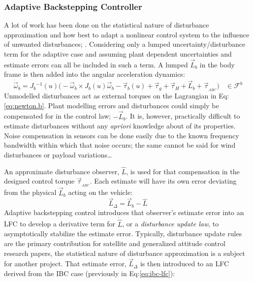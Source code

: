 {\subsubsection{Adaptive Backstepping Controller}
\label{subsubsec:control.attitude.nonlinear.adaptivebackstep}
A lot of work has been done on the statistical nature of disturbance approximation and how best to adapt a nonlinear control system to the influence of unwanted disturbances; \cite{nonlineardisturbance,disturbanceadaptivebackstepping,robusttrackingcontrol}. Considering only a lumped uncertainty/disturbance term for the adaptive case and assuming plant dependent uncertainties and estimate errors can all be included in such a term. A lumped $\vec{L}_b$ in the body frame is then added into the angular acceleration dynamics:
\begin{equation}
\dot{\vec{\omega}}_b=J_b\text{}^{-1}(u)\big(-\vec{\omega}_b\times J_b(u)\vec{\omega}_b-\vec{\tau}_b(u)+\vec{\tau}_g+\vec{\tau}_H+\vec{L}_b+\vec{\tau}_{_{ABC}}\big)~~~~\in\mathcal{F}^{b}
\end{equation}
Unmodelled disturbances act as external torques on the Lagrangian in Eq:\ref{eq:newton.b}. Plant modelling errors and disturbances could simply be compensated for in the control law; $-\vec{L}_b$. It is, however, practically difficult to estimate disturbances without any \emph{apriori} knowledge about of its properties. Noise compensation in sensors can be done easily due to the known frequency bandwidth within which that noise occurs; the same cannot be said for wind disturbances or payload variations\ldots
\par
An approximate disturbance observer, $\hat{L}$, is used for that compensation in the designed control torque $\vec{\tau}_{_{ABC}}$. Each estimate will have its own error deviating from the physical $\vec{L}_b$ acting on the vehicle:
\begin{equation}\label{eq:estimate-error}
\vec{L}_\Delta=\vec{L}_b-\hat{L}
\end{equation}
Adaptive backstepping control introduces that observer's estimate error into an LFC to develop a derivative term for $\dot{\hat{L}}$, or a \emph{disturbance update law}, to asymptotically stabilize the estimate error. Typically, disturbance update rules are the primary contribution for satellite and generalized attitude control research papers, the statistical nature of disturbance approximation is a subject for another project. That estimate error, $\vec{L}_\Delta$ is then introduced to an LFC derived from the IBC case (previously in Eq:\ref{eq:ibc-lfc}):
}
